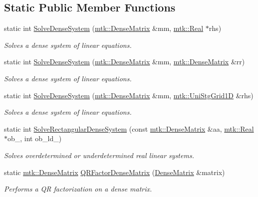 \subsection*{Static Public Member Functions}
\begin{DoxyCompactItemize}
\item 
static int \hyperlink{classmtk_1_1LAPACKAdapter_a7428bccf74fd4a4af68fb7233846da22}{Solve\-Dense\-System} (\hyperlink{classmtk_1_1DenseMatrix}{mtk\-::\-Dense\-Matrix} \&mm, \hyperlink{group__c01-roots_gac080bbbf5cbb5502c9f00405f894857d}{mtk\-::\-Real} $\ast$rhs)
\begin{DoxyCompactList}\small\item\em Solves a dense system of linear equations. \end{DoxyCompactList}\item 
static int \hyperlink{classmtk_1_1LAPACKAdapter_af0723bba1d73450119d093b9cf1ff6f0}{Solve\-Dense\-System} (\hyperlink{classmtk_1_1DenseMatrix}{mtk\-::\-Dense\-Matrix} \&mm, \hyperlink{classmtk_1_1DenseMatrix}{mtk\-::\-Dense\-Matrix} \&rr)
\begin{DoxyCompactList}\small\item\em Solves a dense system of linear equations. \end{DoxyCompactList}\item 
static int \hyperlink{classmtk_1_1LAPACKAdapter_ac38be1e30a2456b2a14c8a81f47c4ba1}{Solve\-Dense\-System} (\hyperlink{classmtk_1_1DenseMatrix}{mtk\-::\-Dense\-Matrix} \&mm, \hyperlink{classmtk_1_1UniStgGrid1D}{mtk\-::\-Uni\-Stg\-Grid1\-D} \&rhs)
\begin{DoxyCompactList}\small\item\em Solves a dense system of linear equations. \end{DoxyCompactList}\item 
static int \hyperlink{classmtk_1_1LAPACKAdapter_a380f148ffdf96bae2f79ae28f1a6560c}{Solve\-Rectangular\-Dense\-System} (const \hyperlink{classmtk_1_1DenseMatrix}{mtk\-::\-Dense\-Matrix} \&aa, \hyperlink{group__c01-roots_gac080bbbf5cbb5502c9f00405f894857d}{mtk\-::\-Real} $\ast$ob\-\_\-, int ob\-\_\-ld\-\_\-)
\begin{DoxyCompactList}\small\item\em Solves overdetermined or underdetermined real linear systems. \end{DoxyCompactList}\item 
static \hyperlink{classmtk_1_1DenseMatrix}{mtk\-::\-Dense\-Matrix} \hyperlink{classmtk_1_1LAPACKAdapter_ae5c6e78c9c819c9ac7a6f31bfd011d7a}{Q\-R\-Factor\-Dense\-Matrix} (\hyperlink{classmtk_1_1DenseMatrix}{Dense\-Matrix} \&matrix)
\begin{DoxyCompactList}\small\item\em Performs a Q\-R factorization on a dense matrix. \end{DoxyCompactList}\end{DoxyCompactItemize}


